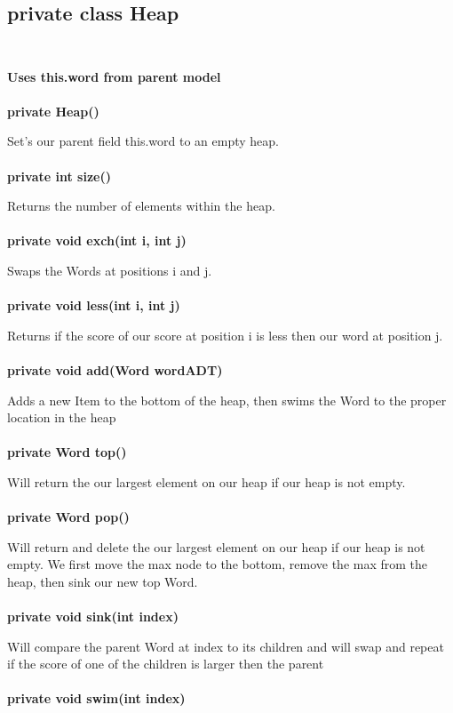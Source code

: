 \documentclass[11pt]{article}
\begin{document}
\subsection{private class Heap\\\\}
\textbf{Uses this.word from parent model\\\\}
%
\textbf{private Heap()\\}

Set's our parent field this.word to an empty heap.\\\\
%
\textbf{private int size()\\}

Returns the number of elements within the heap.\\\\
%
\textbf{private void exch(int i, int j)\\}

Swaps the Words at positions i and j.\\\\
%
\textbf{private void less(int i, int j)\\}

Returns if the score of our score at position i is less then our word at position j.\\\\
%
\textbf{private void add(Word wordADT)\\}

Adds a new Item to the bottom of the heap, then swims the Word to the proper location in the heap\\\\
%
\textbf{private Word top()\\}

Will return the our largest element on our heap if our heap is not empty.\\\\
%
\textbf{private Word pop()\\}

Will return and delete the our largest element on our heap if our heap is not empty. We first move the max node to the bottom, remove the max from the heap, then sink our new top Word.\\\\
%
\textbf{private void sink(int index)\\}

Will compare the parent Word at index to its children and will swap and repeat if the score of one of the children is larger then the parent\\\\
%
\textbf{private void swim(int index)\\}
\end{document}
